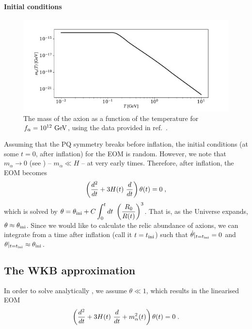 \documentclass[11pt,a4paper]{article}
\begin{document}
\paragraph{Initial conditions}
%
\begin{figure}[h!]
	\includegraphics[width=1\textwidth]{figs/axion_mass.pdf}
	\caption{The mass of the axion as a function of the temperature for $f_{\alpha}{}=10^{12}~{\rm GeV}$, using the data provided in ref.~\cite{Borsanyi:2016ksw}.}
	\label{fig:axion_mass}
\end{figure}
%
Assuming that the PQ symmetry breaks before inflation, the initial conditions (\ie at some $t=0$, after inflation) for the EOM is random. However, we note that $m_{\alpha} \to 0$ (see ) -- \ie $m_{\alpha} \ll H$ -- at very early times. Therefore, after inflation, the EOM becomes
%
\begin{equation}
	\left( \dfrac{d^2}{d t} + 3 H(t) \ \dfrac{d}{d t}   \right) \theta(t) = 0 \; ,
	\label{eq:massless_eom}
\end{equation}
%
which is solved by $\theta = \theta_{\rm ini}{} + C \displaystyle \int_{0}^t d t \ \left(  \dfrac{R_{0}}{R(t)}  \right)^3$. That is, as the Universe expands, $\theta \approx \theta_{\rm ini}{}$. Since we would like to calculate the relic abundance of axions, we can integrate  from a time after inflation (call it $t = t_{\rm ini}{}$) such that $ \dot \theta |_{t=t_{\rm ini}{}} = 0$ and  $\theta|_{t=t_{\rm ini}{}} \approx \theta_{\rm ini}{}$.   



\subsection{The WKB approximation}
%
In order to solve analytically , we assume $\theta \ll 1$, which results in the linearised EOM
%
\begin{equation}
	\left( \dfrac{d^2}{d t} + 3 H(t) \ \dfrac{d}{d t} + m_{\alpha}^2(t)  \right) \theta(t) = 0 \; .
	\label{eq:linear_eom}
\end{equation}
\end{document}
